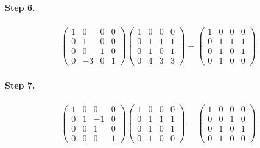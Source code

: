 \documentclass[11pt]{article}
\begin{document}
\paragraph{Step 6.}
\begin{eqnarray*}
\begin{pmatrix}
	1 & 0 & 0 & 0\\
	0 & 1 & 0 & 0\\
	0 & 0 & 1 & 0\\
	0 & -3 & 0 & 1
\end{pmatrix}
\left(\begin{array}{ccc|c}  
	1 & 0 & 0 & 0\\
    0 & 1 & 1 & 1\\
    0 & 1 & 0 & 1\\
    0 & 4 & 3 & 3
\end{array}\right)
=
\left(\begin{array}{ccc|c}  
	1 & 0 & 0 & 0\\
    0 & 1 & 1 & 1\\
    0 & 1 & 0 & 1\\
    0 & 1 & 0 & 0
\end{array}\right)
\end{eqnarray*}

\paragraph{Step 7.}
\begin{eqnarray*}
\begin{pmatrix}
	1 & 0 & 0 & 0\\
	0 & 1 & -1 & 0\\
	0 & 0 & 1 & 0\\
	0 & 0 & 0 & 1
\end{pmatrix}
\left(\begin{array}{ccc|c}  
	1 & 0 & 0 & 0\\
    0 & 1 & 1 & 1\\
    0 & 1 & 0 & 1\\
    0 & 1 & 0 & 0
\end{array}\right)
=
\left(\begin{array}{ccc|c}  
	1 & 0 & 0 & 0\\
    0 & 0 & 1 & 0\\
    0 & 1 & 0 & 1\\
    0 & 1 & 0 & 0
\end{array}\right)
\end{eqnarray*}
\end{document}
